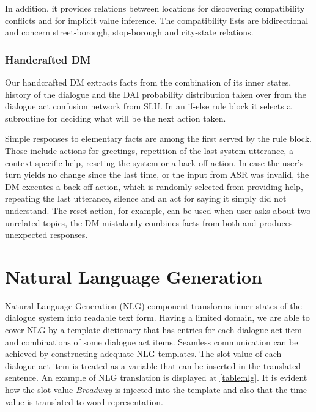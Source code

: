 In addition, it provides relations between locations for discovering compatibility conflicts and for implicit value inference.
The compatibility lists are bidirectional and concern street-borough, stop-borough and city-state relations.

\subsubsection{Handcrafted DM}

Our handcrafted DM extracts facts from the combination of its inner states, history of the dialogue and the DAI probability distribution taken over from the dialogue act confusion network from SLU.
In an if-else rule block it selects a subroutine for deciding what will be the next action taken.

Simple responses to elementary facts are among the first served by the rule block.
Those include actions for greetings, repetition of the last system utterance, a context specific help, reseting the system or a back-off action.
In case the user's turn yields no change since the last time, or the input from ASR was invalid, the DM executes a back-off action, which is randomly selected from providing help, repeating the last utterance, silence and an act for saying it simply did not understand.
The reset action, for example, can be used when user asks about two unrelated topics, the DM mistakenly combines facts from both and 
produces unexpected responses.

\section{Natural Language Generation}

Natural Language Generation (NLG) component transforms inner states of the dialogue system into readable text form.
Having a limited domain, we are able to cover NLG by a template dictionary that has entries for each dialogue act item and combinations of some dialogue act items.
Seamless communication can be achieved by constructing adequate NLG templates.
The slot value of each dialogue act item is treated as a variable that can be inserted in the translated sentence.
An example of NLG translation is displayed at \ref{table:nlg}.
It is evident how the slot value \textit{Broadway} is injected into the template and also that the time value is translated to word representation.

